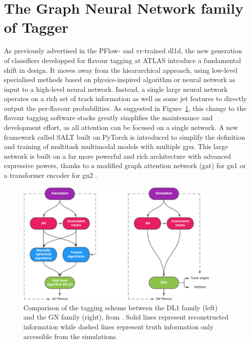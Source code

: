 
\section{The Graph Neural Network family of Tagger}\label{chap:GN}
As previously advertised in the PFlow- and \gls{vr}-trained \gls{dl1d}, the new generation of classifiers developped for flavour tagging at ATLAS introduce a fundamental shift in design. It moves away from the hieararchical approach, using low-level specialised methods based on physics-inspired algorithm or neural network as input to a high-level neural network. Instead, a single large neural network operates on a rich set of track information as well as some jet features to directly output the per-flavour probabilities. As suggested in Figure~\ref{fig:ftagArchi}, this change to the flavour tagging software stacks greatly simplifies the maintenance and development effort, as all attention can be focused on a single network. A new framework called \uppercase{Salt} \cite{SaltCite} built on PyTorch \cite{pytorch} is introduced to simplify the definition and training of multitask multimodal models with multiple \gls{gpu}. This large network is built on a far more powerful and rich architecture with advanced expressive powers, thanks to a modified graph attention network (\gls{gat}) \cite{velickovic2018graph, brody2022how} for \gls{gn1} or a transformer encoder for \gls{gn2} \cite{NIPS_transformerPaper}. 

\begin{figure}[h!]
  \center
  \includegraphics[width=0.9\textwidth]{Images/FTAG/GN/Intro/schematics_difference.png}
  \caption{Comparison of the tagging scheme between the DL1 family (left) and the GN family (right), from \cite{ATL-PHYS-PUB-2022-027}. Solid lines represent reconstructed information while dashed lines represent truth information only accessible from the simulations.} 
  \label{fig:ftagArchi}
\end{figure}

